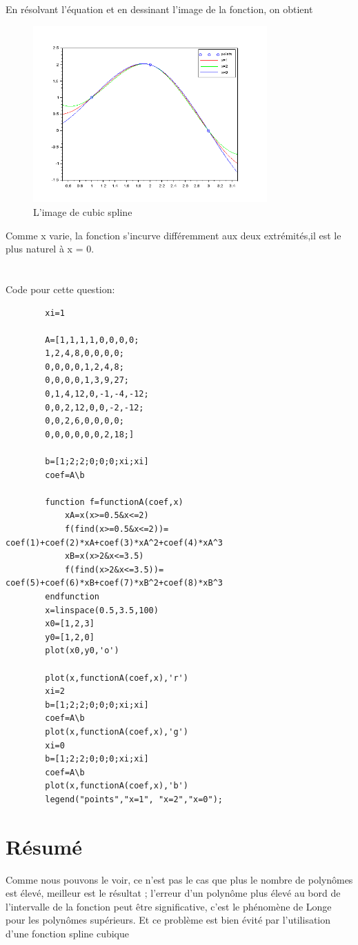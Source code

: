 \documentclass[11pt]{article}
\begin{document}
    En résolvant l'équation et en dessinant l'image de la fonction, on obtient
    \begin{figure}[H]
        \centering
        \includegraphics[width=0.8\textwidth,height=0.5\textwidth]{spline}
        \caption{L'image de cubic spline}
    \end{figure}
    Comme x varie, la fonction s'incurve différemment aux deux extrémités,il est le plus naturel à x = 0.\\
    ~\\~\\
    Code pour cette question:
    \begin{verbatim}
        xi=1

        A=[1,1,1,1,0,0,0,0;
        1,2,4,8,0,0,0,0;
        0,0,0,0,1,2,4,8;
        0,0,0,0,1,3,9,27;
        0,1,4,12,0,-1,-4,-12;
        0,0,2,12,0,0,-2,-12;
        0,0,2,6,0,0,0,0;
        0,0,0,0,0,0,2,18;]

        b=[1;2;2;0;0;0;xi;xi]
        coef=A\b

        function f=functionA(coef,x)
            xA=x(x>=0.5&x<=2)
            f(find(x>=0.5&x<=2))= coef(1)+coef(2)*xA+coef(3)*xA^2+coef(4)*xA^3
            xB=x(x>2&x<=3.5)
            f(find(x>2&x<=3.5))= coef(5)+coef(6)*xB+coef(7)*xB^2+coef(8)*xB^3
        endfunction
        x=linspace(0.5,3.5,100)
        x0=[1,2,3]
        y0=[1,2,0]
        plot(x0,y0,'o')

        plot(x,functionA(coef,x),'r')
        xi=2
        b=[1;2;2;0;0;0;xi;xi]
        coef=A\b
        plot(x,functionA(coef,x),'g')
        xi=0
        b=[1;2;2;0;0;0;xi;xi]
        coef=A\b
        plot(x,functionA(coef,x),'b')
        legend("points","x=1", "x=2","x=0");
    \end{verbatim}

    \section*{Résumé}
    Comme nous pouvons le voir, ce n'est pas le cas que plus le nombre de polynômes est élevé, meilleur est le résultat ; l'erreur d'un polynôme plus élevé au bord de l'intervalle de la fonction peut être significative, c'est le phénomène de Longe pour les polynômes supérieurs.
    Et ce problème est bien évité par l'utilisation d'une fonction spline cubique
\end{document}
